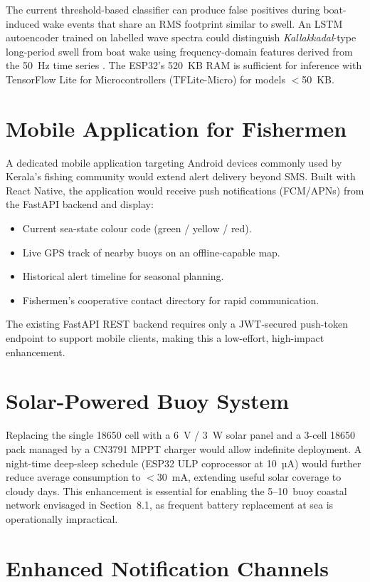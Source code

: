 The current threshold-based classifier can produce false positives during
boat-induced wake events that share an RMS footprint similar to swell.
An LSTM autoencoder trained on labelled wave spectra could distinguish
\textit{Kallakkadal}-type long-period swell from boat wake using frequency-domain
features derived from the 50~Hz time series \cite{durap2024waveheight}.
The ESP32's 520~KB RAM is sufficient for inference with TensorFlow Lite for
Microcontrollers (TFLite-Micro) for models $<$50~KB.

\section{Mobile Application for Fishermen}

A dedicated mobile application targeting Android devices commonly used by Kerala's
fishing community would extend alert delivery beyond SMS.
Built with React Native, the application would receive push notifications (FCM/APNs)
from the FastAPI backend and display:
\begin{itemize}
  \item Current sea-state colour code (green / yellow / red).
  \item Live GPS track of nearby buoys on an offline-capable map.
  \item Historical alert timeline for seasonal planning.
  \item Fishermen's cooperative contact directory for rapid communication.
\end{itemize}
The existing FastAPI REST backend requires only a JWT-secured push-token endpoint to
support mobile clients, making this a low-effort, high-impact enhancement.

\section{Solar-Powered Buoy System}

Replacing the single 18650 cell with a 6~V / 3~W solar panel and a 3-cell 18650
pack managed by a CN3791 MPPT charger would allow indefinite deployment.
A night-time deep-sleep schedule (ESP32 ULP coprocessor at 10~µA) would further
reduce average consumption to $<$30~mA, extending useful solar coverage to cloudy days.
This enhancement is essential for enabling the 5--10~buoy coastal network envisaged in
Section~8.1, as frequent battery replacement at sea is operationally impractical.

\section{Enhanced Notification Channels}

